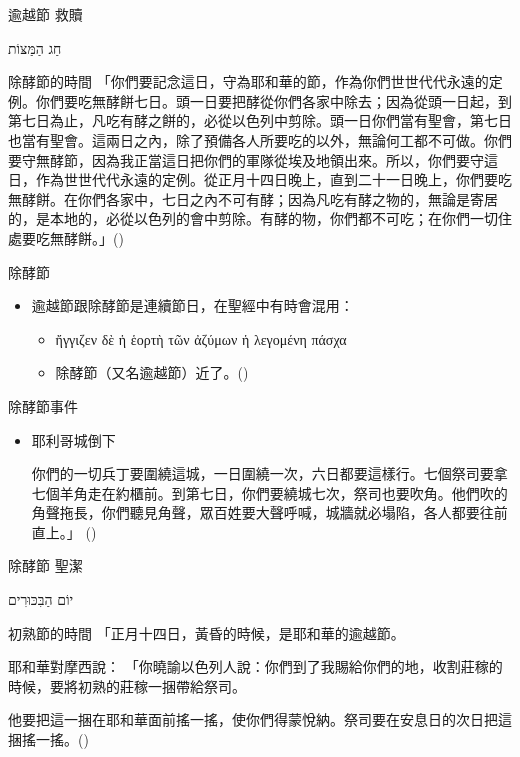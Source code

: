 \documentclass{beamer}
\newcommand{\topic}[1]{
  \begin{frame}
    \centering
    \vspace*{1cm}
    {\fontsize{40}{48}\selectfont #1\par}
    \vfill
  \end{frame}
}
\newcommand{\conclusion}[2]{
  \begin{frame}
    \centering
    \vspace*{1cm}
    {\fontsize{40}{48}\selectfont #1 \textemdash #2\par}
    \vfill
  \end{frame}
}
\newcommand{\parvspace}{\par\vspace{0.5em}}
\begin{document}
\conclusion{逾越節}{救贖}

\topic{\texthebrew{חַג הַמַּצּוֹת}}

\begin{frame}{除酵節的時間}
  「你們要記念這日，守為耶和華的節，作為你們世世代代永遠的定例。\alert{你們要吃無酵餅七日。頭一日要把酵從你們各家中除去}；因為從頭一日起，到第七日為止，凡吃有酵之餅的，必從以色列中剪除。\alert{頭一日你們當有聖會，第七日也當有聖會}。這兩日之內，除了預備各人所要吃的以外，無論何工都不可做。\alert{你們要守無酵節，因為我正當這日把你們的軍隊從埃及地領出來}。所以，你們要守這日，作為世世代代永遠的定例。從\alert{正月十四日晚上，直到二十一日晚上}，你們要吃無酵餅。在你們各家中，七日之內不可有酵；因為凡吃有酵之物的，無論是寄居的，是本地的，必從以色列的會中剪除。有酵的物，你們都不可吃；在你們一切住處要吃無酵餅。」()\parvspace
\end{frame}

\begin{frame}{除酵節}
  \begin{itemize}
    \item 逾越節跟除酵節是連續節日，在聖經中有時會混用：
      \begin{itemize}
        \item \textgreek{ἤγγιζεν δὲ ἡ \alert{ἑορτὴ τῶν ἀζύμων} ἡ λεγομένη \alert{πάσχα}}\
        \item 除酵節（又名逾越節）近了。()
      \end{itemize}
  \end{itemize}
\end{frame}

\begin{frame}{除酵節事件}
  \begin{itemize}
    \item 耶利哥城倒下\par
      你們的一切兵丁要圍繞這城，一日圍繞一次，六日都要這樣行。七個祭司要拿七個羊角走在約櫃前。到第七日，你們要繞城七次，祭司也要吹角。他們吹的角聲拖長，你們聽見角聲，眾百姓要大聲呼喊，城牆就必塌陷，各人都要往前直上。」 ()
  \end{itemize}
\end{frame}

\conclusion{除酵節}{聖潔}

\topic{\texthebrew{יוֹם הַבִּכּוּרִים}}

\begin{frame}{初熟節的時間}
  「正月十四日，黃昏的時候，是耶和華的逾越節。\textellipsis{}\parvspace
  耶和華對摩西說： 「你曉諭以色列人說：你們到了我賜給你們的地，收割莊稼的時候，要將初熟的莊稼一捆帶給祭司。\parvspace
  他要把這一捆在耶和華面前搖一搖，使你們得蒙悅納。祭司要在\alert{安息日的次日}把這捆搖一搖。()\parvspace
\end{frame}
\end{document}
